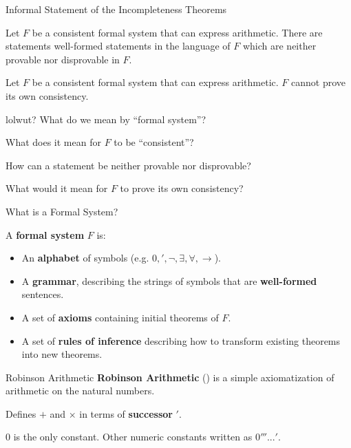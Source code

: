 \documentclass{beamer}
\begin{document}
\begin{frame}{Informal Statement of the Incompleteness Theorems}
  \begin{theorem}
    Let $F$ be a consistent formal system that can express arithmetic. There
    are statements well-formed statements in the language of $F$ which are
    neither provable nor disprovable in $F$.
  \end{theorem}

  \pause

  \begin{theorem}
    Let $F$ be a consistent formal system that can express arithmetic. $F$
    cannot prove its own consistency.
  \end{theorem}
\end{frame}

\begin{frame}{lolwut?}
  What do we mean by ``formal system''?

  \pause

  What does it mean for $F$ to be ``consistent''?

  \pause

  How can a statement be neither provable nor disprovable?

  \pause

  What would it mean for $F$ to prove its own consistency?
\end{frame}

\begin{frame}{What is a Formal System?}

  A \textbf{formal system} $F$ is:
  \begin{itemize}
  \item An \textbf{alphabet} of symbols (e.g. $0, ', \neg, \exists, \forall, \rightarrow$).
  \item A \textbf{grammar}, describing the strings of symbols that are
    \textbf{well-formed} sentences.
  \item A set of \textbf{axioms} containing initial theorems of $F$.
  \item A set of \textbf{rules of inference} describing how to transform
    existing theorems into new theorems.
  \end{itemize}

\end{frame}

\begin{frame}{Robinson Arithmetic}
  \textbf{Robinson Arithmetic} (\robinson) is a simple axiomatization of
  arithmetic on the natural numbers.

  \pause

  Defines $+$ and $\times$ in terms of \textbf{successor} $'$.

  \pause

  $0$ is the only constant. Other numeric constants written as $0'''...'$.

\end{frame}
\end{document}
